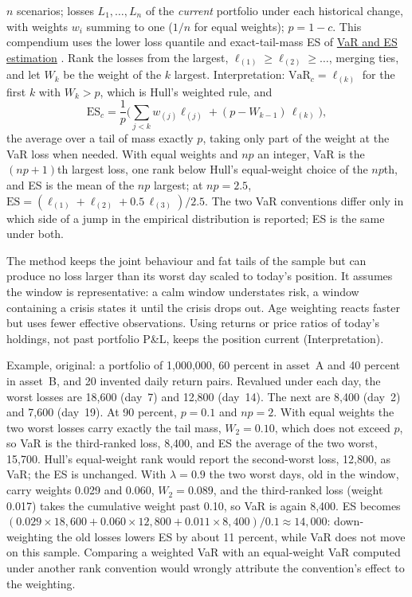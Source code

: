 \begin{qfmethod}
 $n$ scenarios; losses $L_1,\dots,L_n$ of the \emph{current} portfolio under each historical change, with weights $w_i$ summing to one ($1/n$ for equal weights); $p=1-c$. This compendium uses the lower loss quantile and exact-tail-mass ES of \hyperref[meth:var-es-estimation-methods]{VaR and ES estimation} \citep[Definitions~2.2 and~2.6, pp.~3 and~5; Proposition~3.2, p.~6]{acerbi-tasche-2001}. Rank the losses from the largest, $\ell_{(1)}\ge\ell_{(2)}\ge\dots$, merging ties, and let $W_k$ be the weight of the $k$ largest. Interpretation: $\mathrm{VaR}_c=\ell_{(k)}$ for the first $k$ with $W_k>p$, which is Hull's weighted rule, and
\[ \mathrm{ES}_c=\frac1p\Big(\sum_{j<k}w_{(j)}\ell_{(j)}+(p-W_{k-1})\,\ell_{(k)}\Big), \]
the average over a tail of mass exactly $p$, taking only part of the weight at the VaR loss when needed. With equal weights and $np$ an integer, VaR is the $(np+1)$th largest loss, one rank below Hull's equal-weight choice of the $np$th, and ES is the mean of the $np$ largest; at $np=2.5$, $\mathrm{ES}=(\ell_{(1)}+\ell_{(2)}+0.5\,\ell_{(3)})/2.5$. The two VaR conventions differ only in which side of a jump in the empirical distribution is reported; ES is the same under both.

 The method keeps the joint behaviour and fat tails of the sample but can produce no loss larger than its worst day scaled to today's position. It assumes the window is representative: a calm window understates risk, a window containing a crisis states it until the crisis drops out. Age weighting reacts faster but uses fewer effective observations. Using returns or price ratios of today's holdings, not past portfolio P\&L, keeps the position current (Interpretation).

 Example, original: a portfolio of 1{,}000{,}000, 60 percent in asset~A and 40 percent in asset~B, and 20 invented daily return pairs. Revalued under each day, the worst losses are 18{,}600 (day~7) and 12{,}800 (day~14). The next are 8{,}400 (day~2) and 7{,}600 (day~19). At 90 percent, $p=0.1$ and $np=2$. With equal weights the two worst losses carry exactly the tail mass, $W_2=0.10$, which does not exceed $p$, so VaR is the third-ranked loss, 8{,}400, and ES the average of the two worst, 15{,}700. Hull's equal-weight rank would report the second-worst loss, 12{,}800, as VaR; the ES is unchanged. With $\lambda=0.9$ the two worst days, old in the window, carry weights 0.029 and 0.060, $W_2=0.089$, and the third-ranked loss (weight 0.017) takes the cumulative weight past 0.10, so VaR is again 8{,}400. ES becomes $(0.029\times18{,}600+0.060\times12{,}800+0.011\times8{,}400)/0.1\approx14{,}000$: down-weighting the old losses lowers ES by about 11 percent, while VaR does not move on this sample. Comparing a weighted VaR with an equal-weight VaR computed under another rank convention would wrongly attribute the convention's effect to the weighting.


\end{qfmethod}
